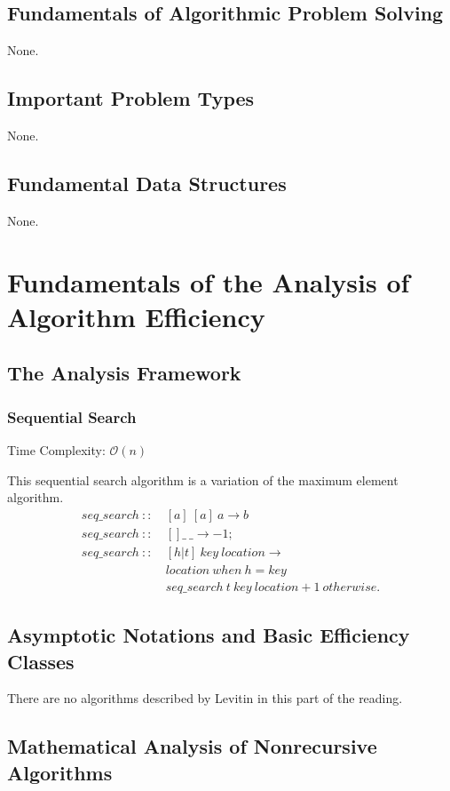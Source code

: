 \documentclass[a4paper,10pt]{book}
\begin{document}
\section{Fundamentals of Algorithmic Problem Solving}
None.
\section{Important Problem Types}
None.
\section{Fundamental Data Structures}
None.
\chapter{Fundamentals of the Analysis of Algorithm
Efficiency}
\section{The Analysis Framework}
\subsection{Sequential Search}
Time Complexity: $\mathcal{O}(n)$

This sequential search algorithm is a variation of the maximum element algorithm.
\begin{align*}
seq\_search\ ::\ &[a]\ [a]\ a\rightarrow b\\
seq\_search\ ::\ &[]\_\ \_\rightarrow -1;\\
seq\_search\ ::\ &[h|t]\ key\ location\rightarrow\\
& location\ when\ h=key\\
&seq\_search\ t\ key\ location+1\ otherwise.
\end{align*}

\section{Asymptotic Notations and Basic Efficiency Classes}
There are no algorithms described by Levitin in this part of the reading.

\section{Mathematical Analysis of Nonrecursive Algorithms}
\end{document}
